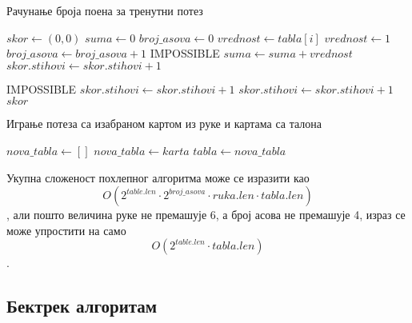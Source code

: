 \documentclass[a4paper, 12pt, ngerman]{article}
\let\oldsubsection\subsection
\renewcommand\subsection{\clearpage\oldsubsection}
\begin{document}
\begin{algorithm}[htbp]
\caption{Рачунање броја поена за тренутни потез}
\label{alg:probaj}
\begin{algorithmic}

	\State $skor \gets (0, 0)$ 
	\State $suma \gets 0$
	\State $broj\_asova \gets 0$
			\Continue
		\EndIf
		\State $vrednost \gets tabla[i]$
				\State $vrednost \gets 1$
			\EndIf
			\State $broj\_asova \gets broj\_asova + 1$
		\EndIf
			\State\Return IMPOSSIBLE
		\EndIf
		\State $suma \gets suma + vrednost$
			\State $skor.stihovi \gets skor.stihovi + 1$
		\EndIf
	\EndFor
	
		\State\Return IMPOSSIBLE
	\EndIf
		\State $skor.stihovi \gets skor.stihovi + 1$
	\EndIf
		\State $skor.stihovi \gets skor.stihovi + 1$
	\EndIf
	\State\Return $skor$
	\EndFunction
\end{algorithmic}
\end{algorithm}

\begin{algorithm}[htbp]
\caption{Играње потеза са изабраном картом из руке и картама са талона}
\label{alg:odigraj}
\begin{algorithmic}
\State{}
\State $nova\_tabla \gets []$
		\State{}
	\EndIf
		\State $nova\_tabla \gets karta$
	\EndIf
	\EndFor
	\State $tabla \gets nova\_tabla$
\EndFunction
\end{algorithmic}
\end{algorithm}

Укупна сложеност похлепног алгоритма може се изразити као $$O(2^{table.len} \cdot 2^{broj\_asova} \cdot ruka.len \cdot tabla.len)$$, али пошто величина руке не премашује 6, а број асова не премашује 4, израз се може упростити на само $$O(2^{table.len} \cdot tabla.len)$$.
\subsection{Бектрек алгоритам}
\end{document}
